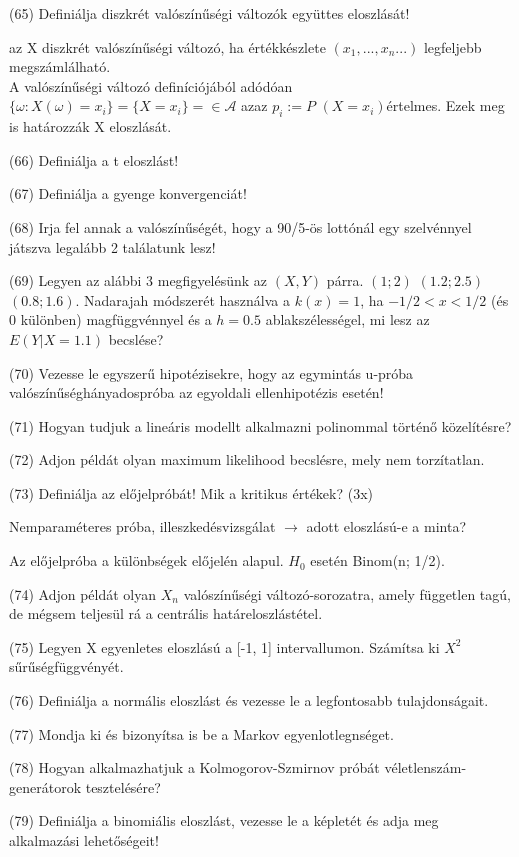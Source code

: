 \documentclass[12p]{article}
\begin{document}
(65) Definiálja diszkrét valószínűségi változók együttes eloszlását!

az X diszkrét valószínűségi változó, ha értékkészlete $(x_1 ,..., x_n...)$ legfeljebb megszámlálható.\\
A valószínűségi változó definíciójából adódóan $\{\omega:X(\omega)= x_i\}=\{X=x_i\}= \in \mathscr{A}$ azaz $p_i:=P$ $(X=x_i)$értelmes. Ezek meg is határozzák X eloszlását.

(66) Definiálja a t eloszlást!

(67) Definiálja a gyenge konvergenciát!

(68) Irja fel annak a valószínűségét, hogy a 90/5-ös lottónál egy szelvénnyel játszva legalább 2 találatunk lesz!

(69) Legyen az alábbi 3 megfigyelésünk az $(X, Y)$ párra. $(1;2)$ $(1.2;2.5)$ $(0.8;1.6)$. Nadarajah
módszerét használva a $k(x) = 1$, ha $-1/2 < x < 1/2$ (és 0 különben) magfüggvénnyel és a $h = 0.5$ ablakszélességel, mi lesz az $E(Y|X = 1.1)$ becslése?

(70) Vezesse le egyszerű hipotézisekre, hogy az egymintás u-próba valószínűséghányadospróba az egyoldali ellenhipotézis esetén!

(71) Hogyan tudjuk a lineáris modellt alkalmazni polinommal történő közelítésre?

(72) Adjon példát olyan maximum likelihood becslésre, mely nem torzítatlan.

(73) Definiálja az előjelpróbát! Mik a kritikus értékek? (3x)

Nemparaméteres próba, illeszkedésvizsgálat $\rightarrow$ adott eloszlású-e a minta?

Az előjelpróba a különbségek előjelén alapul. $H_0$ esetén Binom(n; 1/2).

(74) Adjon példát olyan $X_n$ valószínűségi változó-sorozatra, amely független tagú, de mégsem teljesül rá a centrális határeloszlástétel.

(75) Legyen X egyenletes eloszlású a [-1, 1] intervallumon. Számítsa ki $X^2$ sűrűségfüggvényét.

(76) Definiálja a normális eloszlást és vezesse le a legfontosabb tulajdonságait.

(77) Mondja ki és bizonyítsa is be a Markov egyenlotlegnséget.

(78) Hogyan alkalmazhatjuk a Kolmogorov-Szmirnov próbát véletlenszám-generátorok tesztelésére?

(79) Definiálja a binomiális eloszlást, vezesse le a képletét és adja meg alkalmazási lehetőségeit!
\end{document}
